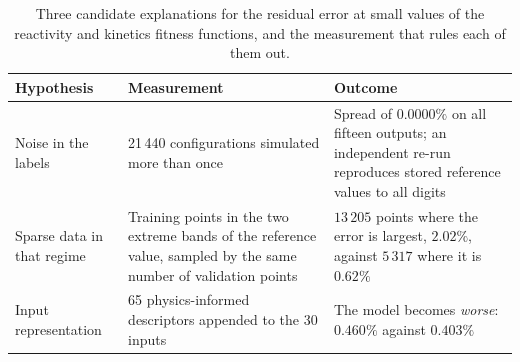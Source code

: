 \begin{table}[htbp]
\centering
\caption{Three candidate explanations for the residual error at small values of
the reactivity and kinetics fitness functions, and the measurement that rules
each of them out.}
\label{tab:hypotheses}
\begin{tabular}{p{2.9cm}p{4.55cm}p{4.55cm}}
\hline
Hypothesis & Measurement & Outcome \\ \hline
Noise in the labels & 21\,440 configurations simulated more than once &
Spread of $0.0000\%$ on all fifteen outputs; an independent re-run reproduces
stored reference values to all digits \\ \hline
Sparse data in that regime & Training points in the two extreme bands of the
reference value, sampled by the same number of validation points &
$13\,205$ points where the error is largest, $2.02\%$, against $5\,317$ where it is
$0.62\%$ \\ \hline
Input representation & 65 physics-informed descriptors appended to the
30 inputs & The model becomes \emph{worse}: $0.460\%$ against $0.403\%$
\\ \hline
\end{tabular}
\end{table}
